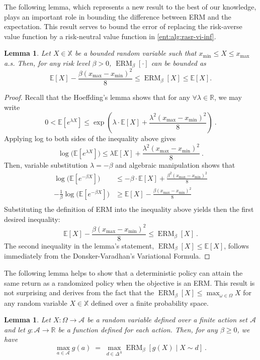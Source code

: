 \documentclass[twoside]{article}
\newcommand{\E}{\mathbb{E}}
\newcommand{\real}{\mathbb{R}}
\newcommand{\actions}{\mathcal{A}}
\renewcommand{\exp}[1]{\operatorname{exp}\left( #1\right) }
\newcommand{\erm}[2]{\operatorname{ERM}_{#1}\left[#2\right]}
\newcommand{\Real}{\mathbb{R}}
\theoremstyle{plain}
\newtheorem{lemma}[theorem]{Lemma}
\theoremstyle{definition}
\theoremstyle{remark}
\renewcommand{\cite}[1]{\citep{#1}}
\begin{document}
The following lemma, which represents a new result to the best of our knowledge, plays an important role in bounding the difference between ERM and the expectation. This result serves to bound the error of replacing the risk-averse value function by a risk-neutral value function in \cref{ent:alg:rasr-vi-inf}. 
\begin{lemma} \label{ent:lem:bound-approximation}
Let $X \in \mathbb{X}$ be a bounded random variable such that $x_{\min} \le X \le x_{\max}$ a.s. Then, for any risk level $\beta > 0$, $\erm{\beta}{\cdot}$ can be bounded as
\[
 \E[X] - \frac{\beta(x_{\max}-x_{\min})^2}{8} \le \erm{\beta}{X} \le \E[X].
\]
\end{lemma}
\begin{proof}
Recall that the Hoeffding's lemma shows that for any $\forall \lambda \in \real$, we may write~\cite{Massart2003,Boucheron2013}
\[
    0 < \E[e^{\lambda X}] \leq \exp{\lambda\cdot  \E[X] + \frac{\lambda^2 (x_{\max}-x_{\min})^2}{8}}~.
  \]
Applying log to both sides of the inequality above gives
\[
    \log\big(\E[e^{\lambda X}]\big) \leq \lambda \E[X] + \frac{\lambda^2 (x_{\max}-x_{\min})^2}{8} ~.
\]
Then, variable substitution $\lambda = -\beta$ and algebraic manipulation shows that
\begin{align*}
    \log\big(\E[e^{-\beta X}]\big) & \leq -\beta\cdot  \E[X] + \frac{\beta^2 (x_{\max}-x_{\min})^2}{8}\\
    -\frac{1}{\beta}\log\big(\E[e^{-\beta X}]\big) &\geq  \E[X] - \frac{\beta (x_{\max}-x_{\min})^2}{8}\\
\end{align*}
Substituting the definition of ERM into the inequality above yields then the first desired inequality:
\[
    \E[X] - \frac{\beta (x_{\max}-x_{\min})^2}{8} \leq \erm{\beta}{X}~.
\]
The second inequality in the lemma's statement, $\erm{\beta}{X} \leq \E[X]$, follows immediately from the Donsker-Varadhan's Variational Formula. 
\end{proof}

The following lemma helps to show that a deterministic policy can attain the same return as a randomized policy when the objective is an ERM. This result is not surprising and derives from the fact that the $\erm{\beta}{X} \le \max_{\omega \in \Omega} X$ for any random variable $X\in \mathbb{X}$ defined over a finite probability space.

\begin{lemma}  \label{ent:proof:deterministic_action}
Let $X\colon \Omega \to \mathcal{A}$ be a random variable defined over a finite action set $\mathcal{A}$ and let $g\colon  \mathcal{A}\to \Real$ be a function defined for each action. Then, for any $\beta \ge 0$, we have 
\[
    \max_{a \in \actions} g(a) \;=\;  \max_{d \in \Delta^A} \erm{\beta}{ g(X) \mid  X \sim d }~.
  \]
\end{lemma}
\end{document}
